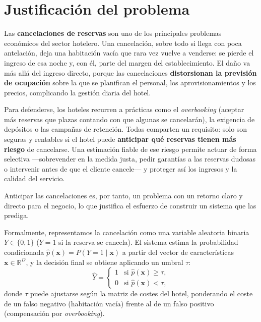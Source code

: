 \documentclass[10pt,twocolumn,a4paper]{article}
\begin{document}
\section{Justificación del problema}

Las \textbf{cancelaciones de reservas} son uno de los principales problemas
económicos del sector hotelero. Una cancelación, sobre todo si llega con poca
antelación, deja una habitación vacía que rara vez vuelve a venderse: se pierde el
ingreso de esa noche y, con él, parte del margen del establecimiento. El daño va más
allá del ingreso directo, porque las cancelaciones \textbf{distorsionan la previsión
de ocupación} sobre la que se planifican el personal, los aprovisionamientos y los
precios, complicando la gestión diaria del hotel.

Para defenderse, los hoteles recurren a prácticas como el \emph{overbooking}
(aceptar más reservas que plazas contando con que algunas se cancelarán), la
exigencia de depósitos o las campañas de retención. Todas comparten un requisito:
solo son seguras y rentables si el hotel puede \textbf{anticipar qué reservas tienen
más riesgo} de cancelarse. Una estimación fiable de ese riesgo permite actuar de
forma selectiva ---sobrevender en la medida justa, pedir garantías a las reservas
dudosas o intervenir antes de que el cliente cancele--- y proteger así los ingresos y
la calidad del servicio.

Anticipar las cancelaciones es, por tanto, un problema con un retorno claro y directo
para el negocio, lo que justifica el esfuerzo de construir un sistema que las prediga.

Formalmente, representamos la cancelación como una variable aleatoria binaria
$Y \in \{0,1\}$ ($Y=1$ si la reserva se cancela). El sistema estima la probabilidad
condicionada $\hat{p}(\mathbf{x}) = P(Y=1 \mid \mathbf{x})$ a partir del vector de
características $\mathbf{x} \in \mathbb{R}^{D}$, y la decisión final se obtiene aplicando
un umbral $\tau$:
\begin{equation}
\hat{Y} =
\begin{cases}
1 & \text{si } \hat{p}(\mathbf{x}) \geq \tau, \\
0 & \text{si } \hat{p}(\mathbf{x}) < \tau,
\end{cases}
\end{equation}
donde $\tau$ puede ajustarse según la matriz de costes del hotel, ponderando el coste de
un falso negativo (habitación vacía) frente al de un falso positivo (compensación por
\emph{overbooking}).
\end{document}
